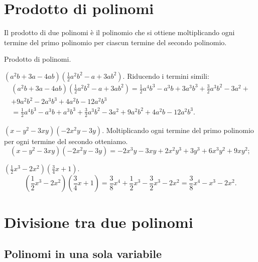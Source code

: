 \ovalbox{\risolvii \ref{ese:11.20}, \ref{ese:11.21}, \ref{ese:11.22}}

\section{Prodotto di polinomi}

Il prodotto di due polinomi è il polinomio che si ottiene
moltiplicando ogni termine del primo polinomio per ciascun termine del
secondo polinomio.

\begin{exrig}
 \begin{esempio}
 Prodotto di polinomi.

 \begin{enumeratea}
   \item $\left(a^{2}b+3a-4{ab}\right)\left(\frac{1}{2}a^{2}b^{2}-a+3{ab}^{2}\right).$ Riducendo i termini simili:
 \begin{multline*}
  \left(a^{2}b+3a-4{ab}\right)\left(\frac{1}{2}a^{2}b^{2}-a+3{ab}^{2}\right)=%
   \frac{1}{2}a^{4}b^{3}-a^{3}b+3a^{3}b^{3}+\frac{3}{2}a^{3}b^{2}-3a^{2}+\\
   +9a^{2}b^{2} -2a^{3}b^{3}+4a^{2}b-12a^{2}b^{3}\\
  =\frac{1}{2}a^{4}b^{3}-a^{3}b+a^{3}b^{3}+\frac{3}{2}a^{3}b^{2}-3a^{2}+9a^{2}b^{2}+4a^{2}b-12a^{2}b^{3}.
 \end{multline*}
 \item  $\left(x-y^{2}-3{xy}\right) \left(-2x^{2}y-3y\right).$
 Moltiplicando ogni termine del primo polinomio per ogni termine del
secondo otteniamo.
\[\left(x-y^{2}-3{xy}\right)\left(-2x^{2}y-3y\right)=-2x^{3}y-3{xy}+2x^{2}y^{3}+3y^{3}+6x^{3}y^{2}+9{xy}^{2};\]

 \item $\left(\frac{1}{2}x^{3}-2x^{2}\right)\left(\frac{3}{4}x+1\right)$.
 \[\left(\frac{1}{2}x^{3}-2x^{2}\right)\left(\frac{3}{4}x+1\right)=\frac{3}{8}x^{4}+\frac{1}{2}x^{3}-\frac{3}{2}x^{3}-2x^{2}=\frac{3}{8}x^{4}-x^{3}-2x^{2}.\]
 \end{enumeratea}
 \end{esempio}
\end{exrig}
\ovalbox{\risolvi \ref{ese:11.23}}

\section{Divisione tra due polinomi}

\subsection{Polinomi in una sola variabile}

